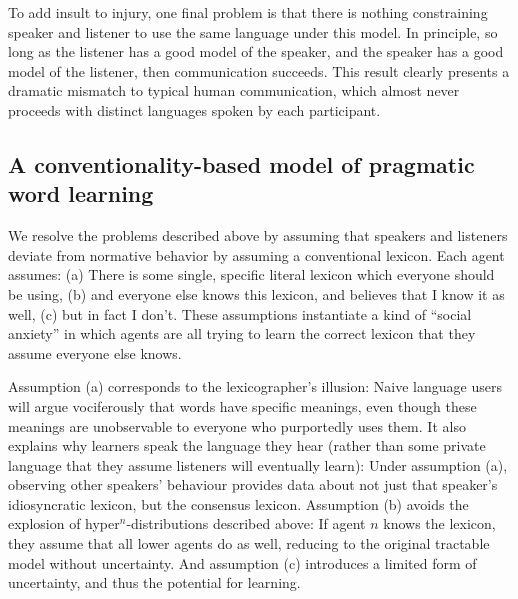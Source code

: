 \documentclass{article} %
\begin{document}
To add insult to injury, one final problem is that there is nothing constraining speaker and listener to use the same language under this model. In principle, so long as the listener has a good model of the speaker, and the speaker has a good model of the listener, then communication succeeds. This result clearly presents a dramatic mismatch to typical human communication, which almost never proceeds with distinct languages spoken by each participant.


\subsection{A conventionality-based model of pragmatic word learning}

We resolve the problems described above by assuming that speakers and listeners deviate from normative behavior by assuming a conventional lexicon. 
Each agent assumes: (a) There is some single, specific literal lexicon which everyone should be using, (b) and everyone else knows this lexicon, and believes that I know it as well, (c) but in fact I don't. These assumptions instantiate a kind of ``social anxiety'' in which agents are all trying to learn the correct lexicon that they assume everyone else knows.

Assumption (a) corresponds to the lexicographer's illusion: Naive language users will argue vociferously that words have specific meanings, even though these meanings are unobservable to everyone who purportedly uses them. It also explains why learners speak the language they hear (rather than some private language that they assume listeners will eventually learn): Under assumption (a), observing other speakers' behaviour provides data about not just that speaker's idiosyncratic lexicon, but the consensus lexicon. Assumption (b) avoids the explosion of hyper$^n$-distributions described above: If agent $n$ knows the lexicon, they assume that all lower agents do as well, reducing to the original tractable model without uncertainty. And assumption (c) introduces a limited form of uncertainty, and thus the potential for learning. 
\end{document}
